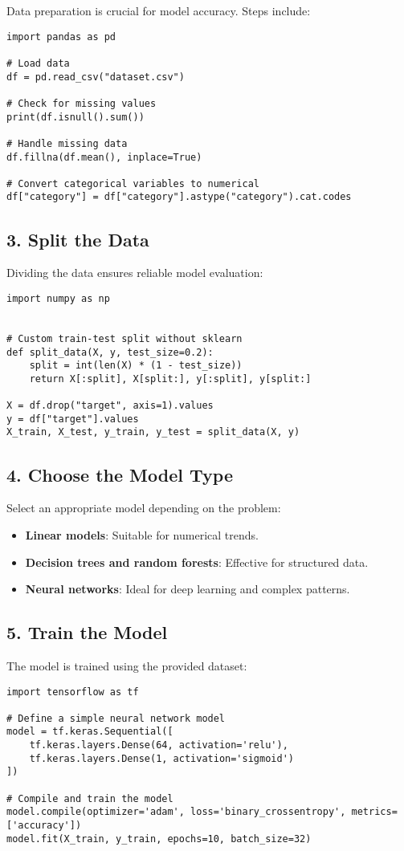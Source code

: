 Data preparation is crucial for model accuracy. Steps include:
\begin{verbatim}
import pandas as pd

# Load data
df = pd.read_csv("dataset.csv")

# Check for missing values
print(df.isnull().sum())

# Handle missing data
df.fillna(df.mean(), inplace=True)

# Convert categorical variables to numerical
df["category"] = df["category"].astype("category").cat.codes
\end{verbatim}

\subsection{3. Split the Data}

Dividing the data ensures reliable model evaluation:
\begin{verbatim}
import numpy as np


# Custom train-test split without sklearn
def split_data(X, y, test_size=0.2):
    split = int(len(X) * (1 - test_size))
    return X[:split], X[split:], y[:split], y[split:]

X = df.drop("target", axis=1).values
y = df["target"].values
X_train, X_test, y_train, y_test = split_data(X, y)
\end{verbatim}

\subsection{4. Choose the Model Type}

Select an appropriate model depending on the problem:
\begin{itemize}
    \item \textbf{Linear models}: Suitable for numerical trends.
    \item \textbf{Decision trees and random forests}: Effective for structured data.
    \item \textbf{Neural networks}: Ideal for deep learning and complex patterns.
\end{itemize}

\subsection{5. Train the Model}

The model is trained using the provided dataset:
\begin{verbatim}
import tensorflow as tf

# Define a simple neural network model
model = tf.keras.Sequential([
    tf.keras.layers.Dense(64, activation='relu'),
    tf.keras.layers.Dense(1, activation='sigmoid')
])

# Compile and train the model
model.compile(optimizer='adam', loss='binary_crossentropy', metrics=['accuracy'])
model.fit(X_train, y_train, epochs=10, batch_size=32)
\end{verbatim}

